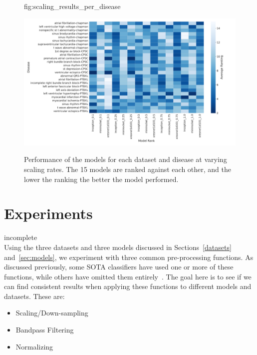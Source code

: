 \documentclass[pmlr,twocolumn]{jmlr}%
\begin{document}
\begin{figure}[tbp]
\floatconts
  {fig:scaling_results_per_disease}
  {\caption{Performance of the models for each dataset and disease at varying scaling rates. The 15 models are ranked against each other, and the lower the ranking the better the model performed. }}
  {\includegraphics[width=1\linewidth]{images/Per-Disease_Model_Performance_all.pdf}}
\end{figure}
\section{Experiments}
\label{sec:experiment}
{\color{red} incomplete}\\
Using the three datasets and three models discussed in Sections~\ref{datasets} and~\ref{sec:models}, we experiment with three common pre-processing functions. As discussed previously, some SOTA classifiers have used one or more of these functions, while others have omitted them entirely~\cite{ribeiro2020automatic}. The goal here is to see if we can find consistent results when applying these functions to different models and datasets. These are:
\begin{itemize}
    \item Scaling/Down-sampling
    \item Bandpass Filtering
    \item Normalizing
\end{itemize}
\end{document}
